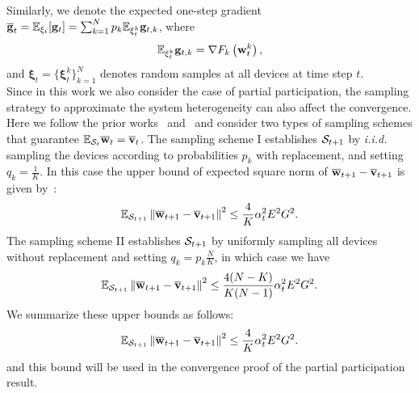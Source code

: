 Similarly, we denote the expected one-step gradient ${\overline{\mathbf{g}}}_{t}= \mathbb{E}_{\xi_t}[{\mathbf{g}}_t] = \sum_{k=1}^{N} p_{k} \mathbb{E}_{\mathbf{\xi}_{t}^{k}} {\mathbf{g}}_{t,k}$, where
\begin{align}
\EE_{\mathbf{\xi}_{t}^{k}} \vg_{t,k}  = \nabla F_{k}\left(\mathbf{w}_{t}^{k}\right), 
\label{eq:gradient}
\end{align}
and $\mathbf{\xi}_t = \{\mathbf{\xi}_t^k\}_{k=1}^N$ denotes random samples at all devices at time step $t$. \\
Since in this work we also consider the case of partial participation, the sampling strategy to approximate the system heterogeneity can also affect the convergence. Here we
follow the prior works~\cite{li2019convergence} and~\cite{li2018federated} and consider two types of sampling
schemes that guarantee $ \mathbb{E}_{{\mathcal{S}}_t} {\overline{\mathbf{w}}}_t = {\overline{\mathbf{v}}}_t$. 
The sampling scheme I establishes ${\mathcal{S}}_{t+1}$ by \emph{i.i.d.} sampling the devices according to probabilities $p_k$ with replacement, and setting $q_k=\frac{1}{K}$.
In this case the upper bound of expected square norm of ${\overline{\mathbf{w}}}_{t+1} - {\overline{\mathbf{v}}}_{t+1}$ is given by~\cite[Lemma 5]{li2019convergence}:
\begin{align}
\mathbb{E}_{{\mathcal{S}}_{t+1}}\left\|{\overline{\mathbf{w}}}_{t+1} - {\overline{\mathbf{v}}}_{t+1}\right\|^2	\leq \frac{4}{K} \alpha_t^2 E^2G^2.
\end{align}
The sampling scheme II establishes ${\mathcal{S}}_{t+1}$ by uniformly sampling all devices without
replacement and setting $q_k=p_k\frac{N}{K}$, in which case we have
\begin{align}
\mathbb{E}_{{\mathcal{S}}_{t+1}}\left\|{\overline{\mathbf{w}}}_{t+1} - {\overline{\mathbf{v}}}_{t+1}\right\|^2	\leq \frac{4(N - K)}{K(N-1)} \alpha_t^2 E^2G^2.
\end{align}
We summarize these upper bounds as follows: 
\begin{align}
	\EE_{\cS_{t+1}}\left\|\ov{w}_{t+1} - \ov{v}_{t+1}\right\|^2 \leq  \frac{4}{K} \alpha_t^2 E^2G^2.
	\label{eq:partialsample}
\end{align}
and this bound will be used in the convergence proof of the partial participation result.
